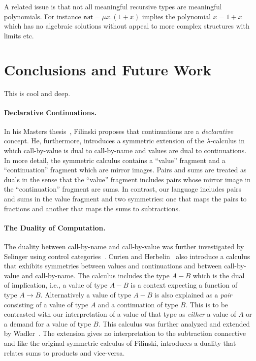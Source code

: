 \documentclass[11pt]{article}
\begin{document}
A related issue is that not all meaningful recursive types are meaningful
polynomials. For instance $\textsf{nat}=\mu x.(1+x)$ implies the polynomial
$x=1+x$ which has no algebraic solutions without appeal to more complex
structures with limits etc.

\section{Conclusions and Future Work} 

This is cool and deep.

\paragraph*{Declarative Continuations.} 
In his Masters thesis~\cite{Filinski:1989:DCI:648332.755574}, Filinski
proposes that continuations are a \emph{declarative} concept. He,
furthermore, introduces a symmetric extension of the $\lambda$-calculus in
which call-by-value is dual to call-by-name and values are dual to
continuations. In more detail, the symmetric calculus contains a ``value''
fragment and a ``continuation'' fragment which are mirror images. Pairs and
sums are treated as duals in the sense that the ``value'' fragment includes
pairs whose mirror image in the ``continuation'' fragment are sums. In
contrast, our language includes pairs and sums in the value fragment and two
symmetries: one that maps the pairs to fractions and another that maps the
sums to subtractions.

\paragraph*{The Duality of Computation.}
The duality between call-by-name and call-by-value was further investigated
by Selinger using control
categories~\cite{Selinger:2001:CCD:966910.966911}. Curien and
Herbelin~\cite{Curien:2000} also introduce a calculus that exhibits
symmetries between values and continuations and between call-by-value and
call-by-name. The calculus includes the type $A-B$ which is the dual of
implication, i.e., a value of type $A-B$ is a context expecting a function of
type $A \rightarrow B$. Alternatively a value of type $A-B$ is also explained
as a \emph{pair} consisting of a value of type $A$ and a continuation of type
$B$. This is to be contrasted with our interpretation of a value of that type
as \emph{either} a value of $A$ or a demand for a value of type $B$. This
calculus was further analyzed and extended by
Wadler~\cite{Wadler:2003,DBLP:conf/rta/Wadler05}. The extension gives no
interpretation to the subtraction connective and like the original symmetric
calculus of Filinski, introduces a duality that relates sums to products and
vice-versa.
\end{document}
